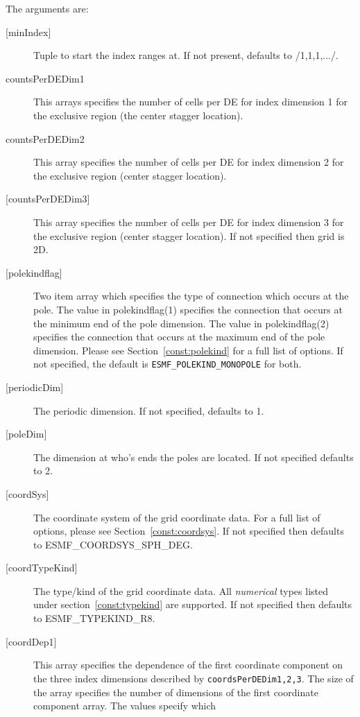    The arguments are:
   \begin{description}
   \item[{[minIndex]}]
        Tuple to start the index ranges at. If not present, defaults
        to /1,1,1,.../.
   \item[countsPerDEDim1]
       This arrays specifies the number of cells per DE for index dimension 1
       for the exclusive region (the center stagger location).
   \item[countsPerDEDim2]
       This array specifies the number of cells per DE for index dimension 2
       for the exclusive region (center stagger location).
   \item[{[countsPerDEDim3]}]
       This array specifies the number of cells per DE for index dimension 3
       for the exclusive region (center stagger location).
       If not specified  then grid is 2D.
   \item[{[polekindflag]}]
        Two item array which specifies the type of connection which occurs at the pole. The value in polekindflag(1)
        specifies the connection that occurs at the minimum end of the pole dimension. The value in polekindflag(2)
        specifies the connection that occurs at the maximum end of the pole dimension. Please see
        Section~\ref{const:polekind} for a full list of options. If not specified,
        the default is {\tt ESMF\_POLEKIND\_MONOPOLE} for both.
   \item[{[periodicDim]}]
        The periodic dimension. If not specified, defaults to 1.
   \item[{[poleDim]}]
        The dimension at who's ends the poles are located. If not specified defaults to 2.
   \item[{[coordSys]}]
       The coordinate system of the grid coordinate data.
       For a full list of options, please see Section~\ref{const:coordsys}.
       If not specified then defaults to ESMF\_COORDSYS\_SPH\_DEG.
   \item[{[coordTypeKind]}]
       The type/kind of the grid coordinate data. All {\em numerical} types
       listed under section~\ref{const:typekind} are supported.
       If not specified then defaults to ESMF\_TYPEKIND\_R8.
   \item[{[coordDep1]}]
       This array specifies the dependence of the first
       coordinate component on the three index dimensions
       described by {\tt coordsPerDEDim1,2,3}. The size of the
       array specifies the number of dimensions of the first
       coordinate component array. The values specify which

\end{description}

